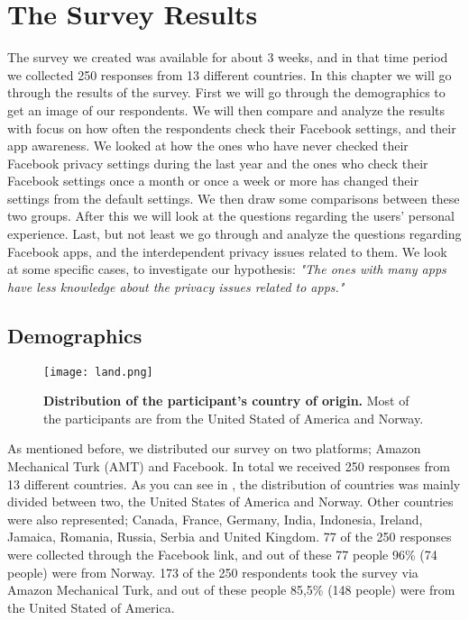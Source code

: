 \chapter{The Survey Results}
\label{chp:surveyresults} 

The survey we created was available for about 3 weeks, and in that time period we collected 250 responses from 13 different countries. In this chapter we will go through the results of the survey. First we will go through the demographics to get an image of our respondents. We will then compare and analyze the results with focus on how often the respondents check their Facebook settings, and their app awareness. We looked at how the ones who have never checked their Facebook privacy settings during the last year and the ones who check their Facebook settings once a month or once a week or more has changed their settings from the default settings. We then draw some comparisons between these two groups. After this we will look at the questions regarding the users' personal experience. Last, but not least we go through and analyze the questions regarding Facebook apps, and the interdependent privacy issues related to them. We look at some specific cases, to investigate our hypothesis: \textit{"The ones with many apps have less knowledge about the privacy issues related to apps."}

\section{Demographics}

\begin{figure}[h!]
\centering
\texttt{[image: land.png]}
\caption[Distribution of the participant's country of origin]{\textbf{Distribution of the participant's country of origin.} Most of the participants are from the United Stated of America and Norway.} 
\label{fig:land}
\end{figure}


As mentioned before, we distributed our survey on two platforms; Amazon Mechanical Turk (AMT) and Facebook. In total we received 250 responses from 13 different countries. As you can see in , the distribution of countries was mainly divided between two, the United States of America and Norway. Other countries were also represented; Canada, France, Germany, India, Indonesia, Ireland, Jamaica, Romania, Russia, Serbia and United Kingdom. 77 of the 250 responses were collected through the Facebook link, and out of these 77 people 96\% (74 people) were from Norway. 173 of the 250 respondents took the survey via Amazon Mechanical Turk, and out of these people 85,5\% (148 people) were from the United Stated of America. 

